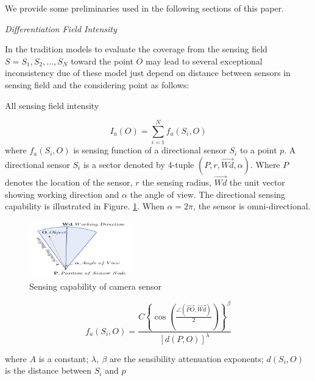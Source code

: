 We provide some preliminaries used in the following sections of this paper.
\begin{df}
	{\itshape Differentiation Field Intensity}
\end{df}
In the tradition models to evaluate the coverage from the sensing field $S=S_1, S_2,..., S_N$ toward the point $O$ may lead to several exceptional inconsistency due of these model just depend on distance between sensors in sensing field and the considering point \cite{megerian2002exposure} as follows:

All sensing field intensity

\begin{equation}
\label{eqia}
I_a(O) = \sum\limits_{i = 1}^N {f_a({S_i},O)} 
\end{equation}
where $f_a(S_i,O)$ is sensing function of a directional sensor $S_i$ to a point $p$. A directional sensor $ S_i $ is a sector denoted by 4-tuple $( P, r, \overrightarrow{Wd}, \alpha )$. Where $ P $ denotes the location of the sensor, $ r $ the sensing radius, $ \overrightarrow{Wd}$ the unit vector showing working direction and $ \alpha $ the angle of view. The directional sensing capability is illustrated in Figure. \ref{Fig.1_1}. When $\alpha=2\pi$, the sensor is omni-directional.\\
\begin{figure}[h]
	\centering
	\includegraphics[width=0.4\textwidth]{hinhanh/sensorView}
	\caption{Sensing capability of camera sensor}
	\label{Fig.1_1}      %
\end{figure}
\begin{equation}
\label{eqfa}
f_a({S_i},O) = \frac{{C{{\left\{ {\cos \left( {\frac{{\angle (\overrightarrow {PO} ,\overrightarrow {Wd}) }}{2}} \right)} \right\}}^\beta }}}{{{{\left[ {d(P,O)} \right]}^\lambda }}}
\end{equation}

where  $A$ is a constant; $\lambda, \ \beta$ are the sensibility attenuation exponents; $d(S_i, O)$ is the distance between $S_i$ and $p$

